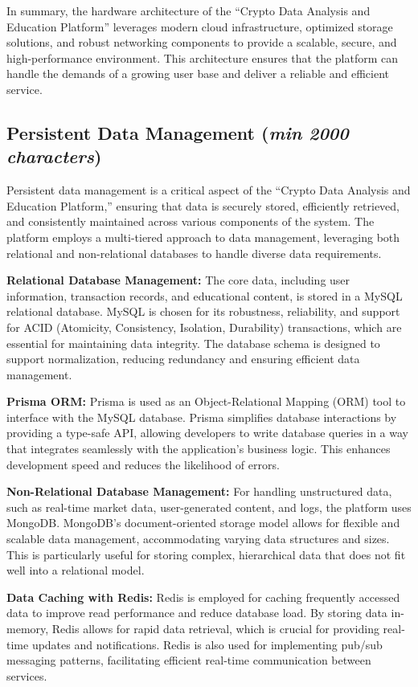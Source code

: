 \documentclass[12pt]{report}
\newcommand{\characters}[1]{(\textit{min #1 characters})}
\begin{document}
In summary, the hardware architecture of the “Crypto Data Analysis and Education Platform” leverages modern cloud infrastructure, optimized storage solutions, and robust networking components to provide a scalable, secure, and high-performance environment. This architecture ensures that the platform can handle the demands of a growing user base and deliver a reliable and efficient service.
\subsection{Persistent Data Management \characters{2000}}
Persistent data management is a critical aspect of the “Crypto Data Analysis and Education Platform,” ensuring that data is securely stored, efficiently retrieved, and consistently maintained across various components of the system. The platform employs a multi-tiered approach to data management, leveraging both relational and non-relational databases to handle diverse data requirements.

\textbf{Relational Database Management:} The core data, including user information, transaction records, and educational content, is stored in a MySQL relational database. MySQL is chosen for its robustness, reliability, and support for ACID (Atomicity, Consistency, Isolation, Durability) transactions, which are essential for maintaining data integrity. The database schema is designed to support normalization, reducing redundancy and ensuring efficient data management.

\textbf{Prisma ORM:} Prisma is used as an Object-Relational Mapping (ORM) tool to interface with the MySQL database. Prisma simplifies database interactions by providing a type-safe API, allowing developers to write database queries in a way that integrates seamlessly with the application’s business logic. This enhances development speed and reduces the likelihood of errors.

\textbf{Non-Relational Database Management:} For handling unstructured data, such as real-time market data, user-generated content, and logs, the platform uses MongoDB. MongoDB’s document-oriented storage model allows for flexible and scalable data management, accommodating varying data structures and sizes. This is particularly useful for storing complex, hierarchical data that does not fit well into a relational model.

\textbf{Data Caching with Redis:} Redis is employed for caching frequently accessed data to improve read performance and reduce database load. By storing data in-memory, Redis allows for rapid data retrieval, which is crucial for providing real-time updates and notifications. Redis is also used for implementing pub/sub messaging patterns, facilitating efficient real-time communication between services.
\end{document}
